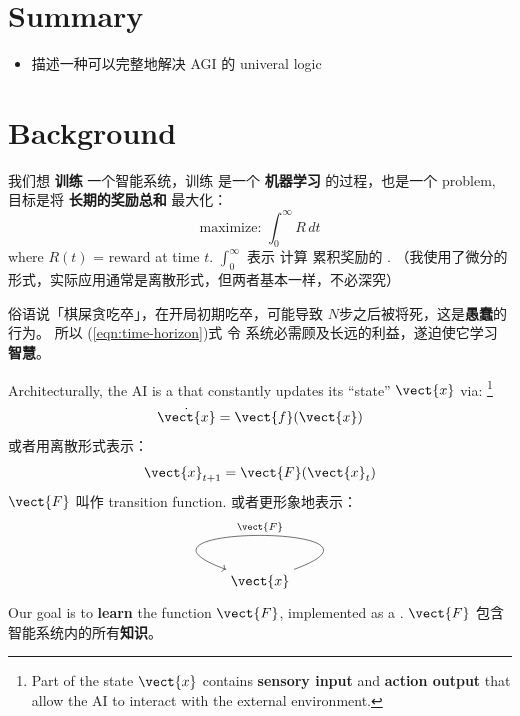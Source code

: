 \section*{Summary}
\begin{itemize}
	\item 描述一种可以完整地解决 AGI 的 univeral logic
\end{itemize}

\tableofcontents

 \setcounter{section}{-1}
\section{Background}

我们想 \textbf{训练} 一个智能系统，训练 是一个 \textbf{机器学习} 的过程，也是一个  problem, 目标是将 \textbf{长期的奖励总和} 最大化：
\begin{equation}
\label{eqn:time-horizon}
\mbox{maximize: } \int_0^{\infty} R \, dt
\end{equation}
where $R(t)$ = reward at time $t$.  $\int_0^{\infty}$ 表示 计算 累积奖励的 .  （我使用了微分的形式，实际应用通常是离散形式，但两者基本一样，不必深究）

俗语说「棋屎贪吃卒」，在开局初期吃卒，可能导致 $N$步之后被将死，这是\textbf{愚蠢}的行为。 所以 (\ref{eqn:time-horizon})式 令 系统必需顾及长远的利益，遂迫使它学习 \textbf{智慧}。

Architecturally, the AI is a  that constantly updates its ``state'' $\vect{x}$ via: \footnote{Part of the state $\vect{x}$ contains \textbf{sensory input} and \textbf{action output} that allow the AI to interact with the external environment.}
\begin{equation}
\dot{\vect{x}} = \vect{f}(\vect{x})
\end{equation}
或者用离散形式表示：
\begin{equation}
\vect{x}_{t+1} = \vect{F}(\vect{x}_t)
\end{equation}
$\vect{F}$ 叫作 transition function.  或者更形象地表示：
\begin{equation}
\label{eqn:AGI-architecture}
\begin{tikzcd}
\vect{x} \arrow[in=160,out=20,loop,looseness=5,swap,"\vect{F}"]
\end{tikzcd}
\end{equation}
Our goal is to \textbf{learn} the function $\vect{F}$, implemented as a .  $\vect{F}$ 包含智能系统内的所有\textbf{知识}。 

